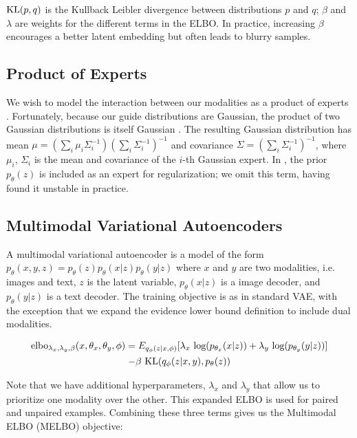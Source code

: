 \documentclass{article}
\begin{document}
$\textup{KL}(p, q)$ is the Kullback Leibler divergence between distributions $p$ and $q$; $\beta$ and $\lambda$ are weights for the different terms in the ELBO. In practice, increasing $\beta$ encourages a better latent embedding but often leads to blurry samples.

\subsection{Product of Experts}

We wish to model the interaction between our modalities as a product of experts \cite{hinton2006training}. Fortunately, because our guide distributions are Gaussian, the product of two Gaussian distributions is itself Gaussian \cite{cao2014generalized}. The resulting Gaussian distribution has mean $\mu = (\sum_{i} \mu_{i}\Sigma^{-1}_{i})(\sum_{i}\Sigma^{-1}_{i})^{-1}$ and covariance $\Sigma = (\sum_{i} \Sigma^{-1}_{i})^{-1}$, where $\mu_{i}$, $\Sigma_{i}$ is the mean and covariance of the $i$-th Gaussian expert. In \cite{hinton2006training}, the prior $p_{\theta}(z)$ is included as an expert for regularization; we omit this term, having found it unstable in practice.

\subsection{Multimodal Variational Autoencoders}

A multimodal variational autoencoder is a model of the form $p_{\theta}(x, y, z) = p_{\theta}(z)p_{\theta}(x|z)p_{\theta}(y|z)$ where $x$ and $y$ are two modalities, i.e. images and text, $z$ is the latent variable, $p_{\theta}(x|z)$ is a image decoder, and $p_{\theta}(y|z)$ is a text decoder. The training objective is as in standard VAE, with the exception that we expand the evidence lower bound definition to include dual modalities.

\begin{multline}
    \textup{elbo}_{\lambda_{x}, \lambda_{y}, \beta}(x, \theta_{x}, \theta_{y}, \phi) = E_{q_{\phi}(z|x, \phi)}[\lambda_{x} \textup{ log}(p_{\theta_{x}}(x|z)) + \lambda_{y} \textup{ log}(p_{\theta_{y}}(y|z))] \\ - \beta \textup{ KL}(q_{\phi}(z|x, y), p_{\theta}(z))
\end{multline}

Note that we have additional hyperparameters, $\lambda_{x}$ and $\lambda_{y}$ that allow us to prioritize one modality over the other. This expanded ELBO is used for paired and unpaired examples. Combining these three terms gives us the Multimodal ELBO (MELBO) objective:
\end{document}
